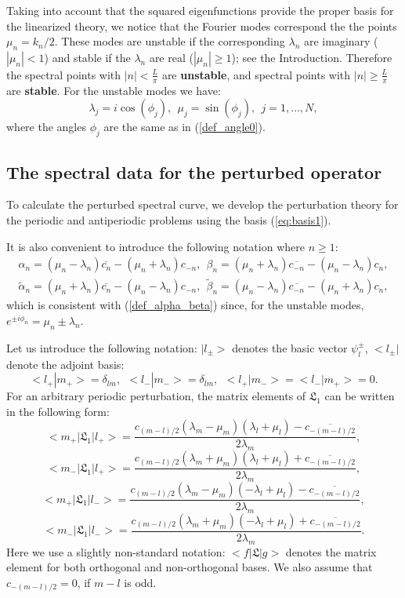 \documentclass[12pt]{article}
\newcommand{\LG}{\mathfrak L}
\begin{document}
Taking into account that the squared eigenfunctions provide the proper basis for the linearized theory, we notice that the  
Fourier modes correspond the the points $\mu_n=k_n/2$. These modes are unstable if the corresponding $\lambda_n$ are 
imaginary ($|\mu_n|<1$)  and stable if the  $\lambda_n$ are real ($|\mu_n|\ge 1$); see the Introduction. Therefore the spectral points 
with  $|n|<\frac{L}{\pi}$ are \textbf{unstable}, and spectral points with $|n|\ge\frac{L}{\pi}$  are \textbf{stable}. For the unstable modes we have:
\begin{equation}
\label{eq:lmphi}
\lambda_j = i\cos(\phi_j), \ \ \mu_j = \sin(\phi_j), \ \ j=1,\ldots,N,
\end{equation}
where the angles $\phi_j$  are the same as in (\ref{def_angle0}).


\subsection{The spectral data for the perturbed operator}
\label{sec:sec4.2}

To calculate the perturbed spectral curve, we develop the perturbation theory for the periodic and antiperiodic problems 
using the basis (\ref{eq:basis1}).

It is also convenient to introduce the following notation where $n\ge 1$:
\begin{align}
\label{def_alpha_beta_2}
\alpha_n =(\mu_n-\lambda_n)  \overline{c_n}-(\mu_n+\lambda_n) c_{-n}, \ \ \beta_n =(\mu_n+\lambda_n) \overline{c_{-n}}-(\mu_n-\lambda_n) c_{n},\\
\tilde{\alpha}_n =(\mu_n+\lambda_n) \overline{c_n}-(\mu_n-\lambda_n) c_{-n}, \ \ \tilde{\beta}_n =(\mu_n-\lambda_n)\overline{c_{-n}}-(\mu_n+\lambda_n) c_{n},
\end{align}
which is consistent with (\ref{def_alpha_beta}) since, for the unstable modes, $e^{\pm i\phi_n}=\mu_n\pm\lambda_n$.

Let us introduce the following notation: $|l_{\pm}>$ denotes the basic vector $\psi^{\pm}_l$, $<l_{\pm}|$ denote the adjoint 
basis:
$$
<l_{+}|m_{+}> = \delta_{lm}, \ \ <l_{-}|m_{-}> = \delta_{lm}, \ \ <l_{+}|m_{-}> = <l_{-}|m_{+}>=0.
$$
For an arbitrary periodic perturbation, the matrix elements of $\LG_1$ can be written in the following form: 
$$
<m_{+}|\LG_1|l_{+}> = \frac{c_{(m-l)/2}(\lambda_{m}-\mu_{m})(\lambda_l+\mu_l)-\overline{c_{-(m-l)/2}}}{2\lambda_{m}},
$$
$$
<m_{-}|\LG_1|l_{+}> = \frac{c_{(m-l)/2}(\lambda_{m}+\mu_{m})(\lambda_l+\mu_l)+\overline{c_{-(m-l)/2}}}{2\lambda_{m}},
$$
$$
<m_{+}|\LG_1|l_{-}> = \frac{c_{(m-l)/2}(\lambda_{m}-\mu_{m})(-\lambda_l+\mu_l)-\overline{c_{-(m-l)/2}}}{2\lambda_{m}},
$$
$$
<m_{-}|\LG_1|l_{-}> = \frac{c_{(m-l)/2}(\lambda_{m}+\mu_{m})(-\lambda_l+\mu_l)+\overline{c_{-(m-l)/2}}}{2\lambda_{m}}.
$$
Here we use a slightly non-standard notation: $<f|\LG|g>$ denotes the matrix element for both orthogonal and 
non-orthogonal bases. We also assume that $c_{-(m-l)/2}=0$, if $m-l$ is odd.
\end{document}
